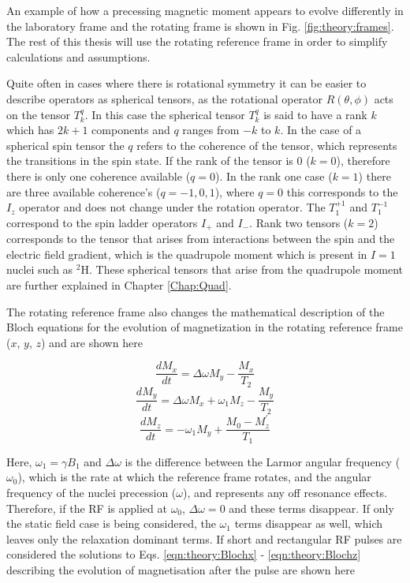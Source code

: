 An example of how a precessing magnetic moment appears to evolve differently in the laboratory frame and the rotating frame is shown in Fig. \ref{fig:theory:frames}. The rest of this thesis will use the rotating reference frame in order to simplify calculations and assumptions. 

Quite often in cases where there is rotational symmetry it can be easier to describe operators as spherical tensors, as the rotational operator $R(\theta,\phi)$ acts on the tensor $T^q_k$. In this case the spherical tensor $T_k^{q}$ is said to have a rank $k$ which has $2k+1$ components and $q$ ranges from $-k$ to $k$. In the case of a spherical spin tensor the $q$ refers to the coherence of the tensor, which represents the transitions in the spin state. If the rank of the tensor is 0 ($k = 0$), therefore there is only one coherence available ($q = 0$). In the rank one case ($k=1$) there are three available coherence's ($q=-1,0,1$), where $q=0$ this corresponds to the $I_z$ operator and does not change under the rotation operator. The $T_1^{+1}$ and $T_1^{-1}$ correspond to the spin ladder operators $I_+$ and $I_-$. Rank two tensors ($k=2$) corresponds to the tensor that arises from interactions between the spin and the electric field gradient, which is the quadrupole moment which is present in $I=1$ nuclei such as $^2$H. These spherical tensors that arise from the quadrupole moment are further explained in Chapter \ref{Chap:Quad}.

The rotating reference frame also changes the mathematical description of the Bloch equations for the evolution of magnetization in the rotating reference frame ($x$, $y$, $z$) and are shown here 

\begin{equation}
    \frac{dM_x}{dt} = \Delta\omega M_y - \frac{M_x}{T_2}
    \label{eqn:theory:Blochx}
\end{equation}
\begin{equation}
    \frac{dM_y}{dt} = \Delta\omega M_x + \omega_1M_z - \frac{M_y}{T_2}
    \label{eqn:theory:Blochy}
\end{equation}
\begin{equation}
    \frac{dM_z}{dt} = -\omega_1M_y + \frac{M_0-M_z^{'}}{T_1}
    \label{eqn:theory:Blochz}
\end{equation}

Here, $\omega_1=\gamma B_1$ and $\Delta\omega$ is the difference between the Larmor angular frequency ($\omega_0$), which is the rate at which the reference frame rotates, and the angular frequency of the nuclei precession ($\omega$), and represents any off resonance effects. Therefore, if the \ac{RF} is applied at $\omega_0$, $\Delta\omega=0$ and these terms disappear. If only the static field case is being considered, the $\omega_1$ terms disappear as well, which leaves only the relaxation dominant terms. If short and rectangular \ac{RF} pulses are considered the solutions to Eqs. \ref{eqn:theory:Blochx} - \ref{eqn:theory:Blochz} describing the evolution of magnetisation after the pulse are shown here

